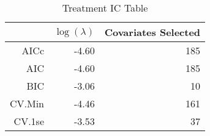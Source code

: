 \begin{table}[ht]
\centering
\begin{tabular}{rrr}
  \hline
 & $\log(\lambda)$ & Covariates Selected \\ 
  \hline
AICc & -4.60 & 185 \\ 
  AIC & -4.60 & 185 \\ 
  BIC & -3.06 &  10 \\ 
  CV.Min & -4.46 & 161 \\ 
  CV.1se & -3.53 &  37 \\ 
   \hline
\end{tabular}
\caption{Treatment IC Table} 
\label{tab:treat_ic}
\end{table}
